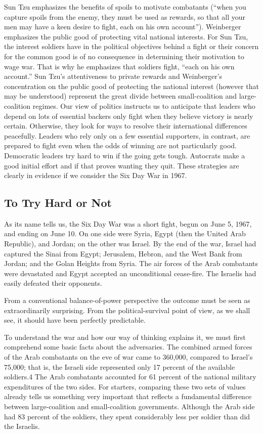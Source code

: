 \documentclass[10pt]{article}
\begin{document}
{\large Sun Tzu emphasizes the benefits of spoils to motivate combatants (``when
you capture spoils from the enemy, they must be used as rewards, so that all your
men may have a keen desire to fight, each on his own account''). Weinberger
emphasizes the public good of protecting vital national interests. For Sun Tzu,
the interest soldiers have in the political objectives behind a fight or their
concern for the common good is of no consequence in determining their motivation
to wage war. That is why he emphasizes that soldiers fight, ``each on his own
account.'' Sun Tzu's attentiveness to private rewards and Weinberger's
concentration on the public good of protecting the national interest (however
that may be understood) represent the great divide between small-coalition and
large-coalition regimes. Our view of politics instructs us to anticipate that
leaders who depend on lots of essential backers only fight when they believe
victory is nearly certain. Otherwise, they look for ways to resolve their
international differences peacefully. Leaders who rely only on a few essential
supporters, in contrast, are prepared to fight even when the odds of winning are
not particularly good. Democratic leaders try hard to win if the going gets
tough. Autocrats make a good initial effort and if that proves wanting they quit.
These strategies are clearly in evidence if we consider the Six Day War in 1967.}

\subsection{To Try Hard or Not}

{\large As its name tells us, the Six Day War was a short fight, begun on June
5, 1967, and ending on June 10. On one side were Syria, Egypt (then the United
Arab Republic), and Jordan; on the other was Israel. By the end of the war,
Israel had captured the Sinai from Egypt; Jerusalem, Hebron, and the West Bank
from Jordan; and the Golan Heights from Syria. The air forces of the Arab
combatants were devastated and Egypt accepted an unconditional cease-fire. The
Israelis had easily defeated their opponents.}

{\large From a conventional balance-of-power perspective the outcome must be
seen as extraordinarily surprising. From the political-survival point of view, as
we shall see, it should have been perfectly predictable.}

{\large To understand the war and how our way of thinking explains it, we must
first comprehend some basic facts about the adversaries. The combined armed
forces of the Arab combatants on the eve of war came to 360,000, compared to
Israel's 75,000; that is, the Israeli side represented only 17 percent of the
available soldiers.4 The Arab combatants accounted for 61 percent of the national
military expenditures of the two sides. For starters, comparing these two sets of
values already tells us something very important that reflects a fundamental
difference between large-coalition and small-coalition governments. Although the
Arab side had 83 percent of the soldiers, they spent considerably less per
soldier than did the Israelis.}
\end{document}

